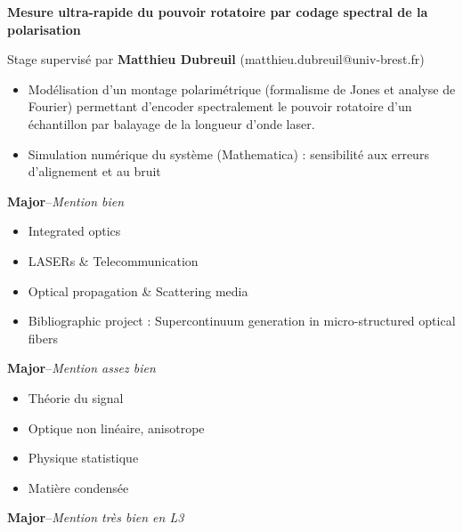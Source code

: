 \documentclass[9pt,a4paper,academicons]{altacv}
\begin{document}

\textbf{Mesure ultra-rapide du pouvoir rotatoire par codage spectral de la
	polarisation}\smallskip
	
	Stage supervisé par \textbf{Matthieu Dubreuil} (matthieu.dubreuil@univ-brest.fr)
	\smallskip
\small{
	\begin{itemize}
		\item Modélisation d'un montage polarimétrique (formalisme de Jones et analyse de Fourier) permettant d'encoder spectralement le pouvoir rotatoire d'un échantillon par balayage de la longueur d'onde laser.
		\item Simulation numérique du système (Mathematica) : sensibilité aux erreurs d'alignement et au bruit
	\end{itemize}
}





\hfill \textbf{Major}--\textit{Mention bien}
\vspace{-1em}\small{
	
  \begin{itemize}
    \item Integrated optics
    \item LASERs \& Telecommunication
    \item Optical propagation  \& Scattering media
    \item Bibliographic project : Supercontinuum generation in micro-structured optical fibers
  \end{itemize}
}

\divider

\hfill\textbf{Major}--\textit{Mention assez bien} 
\vspace{-1em}\small{
  \begin{itemize}
    \item Théorie du signal
    \item Optique non linéaire, anisotrope
    \item Physique statistique
    \item Matière condensée
  \end{itemize}
}
\divider

\hfill \textbf{Major}--\textit{Mention très bien en L3}
\end{document}
